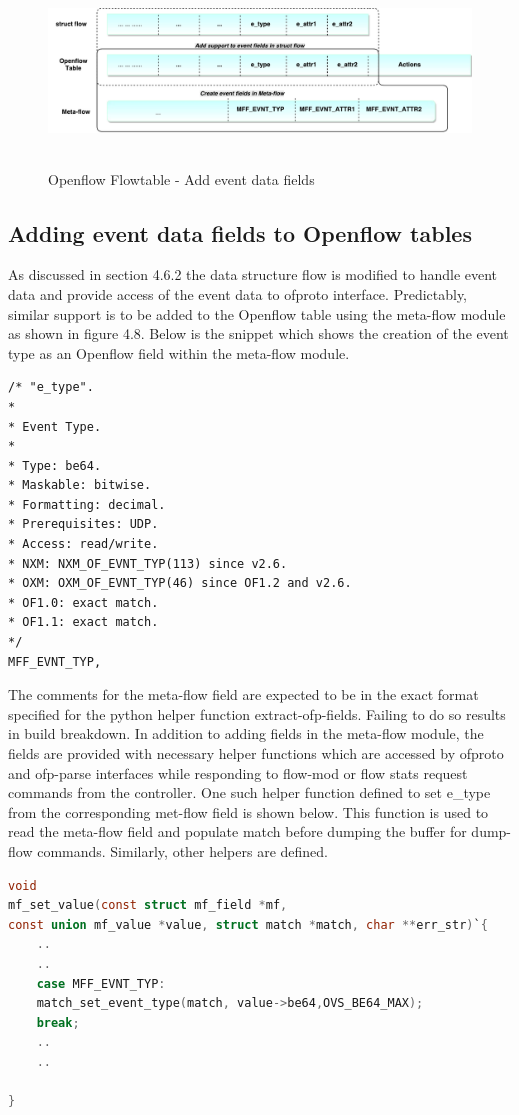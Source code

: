 \begin{figure}[H]
	\centering
	\caption{Openflow Flowtable - Add event data fields}
	\includegraphics[height=5cm]{flowtable.pdf}
\end{figure}

\subsection{Adding event data fields to Openflow tables}
 As discussed in section 4.6.2 the data structure flow is modified to handle event data and provide access of the event data to ofproto interface. Predictably, similar support is to be added to the Openflow table using the meta-flow module as shown in figure 4.8. Below is the snippet which shows the creation of the event type as an Openflow field within the meta-flow module. \newline

\begin{lstlisting}
/* "e_type".
*
* Event Type.
*
* Type: be64.
* Maskable: bitwise.
* Formatting: decimal.
* Prerequisites: UDP.
* Access: read/write.
* NXM: NXM_OF_EVNT_TYP(113) since v2.6.
* OXM: OXM_OF_EVNT_TYP(46) since OF1.2 and v2.6.
* OF1.0: exact match.
* OF1.1: exact match.
*/    
MFF_EVNT_TYP,
\end{lstlisting}


The comments for the meta-flow field are expected to be in the exact format specified for the python helper function extract-ofp-fields. Failing to do so results in build breakdown. In addition to adding fields in the meta-flow module, the fields are provided with necessary helper functions which are accessed by ofproto and ofp-parse interfaces while responding to flow-mod or flow stats request commands from the controller. One such helper function defined to set e_type from the corresponding met-flow field is shown below. This function is used to read the meta-flow field and populate match before dumping the buffer for dump-flow commands. Similarly, other helpers are defined. \newline
\begin{lstlisting}[language=c]
void
mf_set_value(const struct mf_field *mf,
const union mf_value *value, struct match *match, char **err_str)`{
	..
	..
	case MFF_EVNT_TYP:
	match_set_event_type(match, value->be64,OVS_BE64_MAX);
	break;	
	..
	..
	
}
\end{lstlisting}

